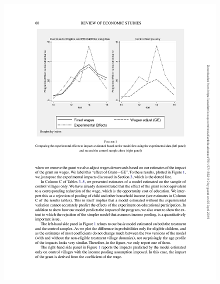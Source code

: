 \documentclass{handoutForSolutions}
\begin{document}
\begin{figure}[H]
\centering
\includegraphics[width=1\linewidth]{image/AttanasioMeghir Santiago2011Figure6.pdf}
\end{figure}
\end{document}
